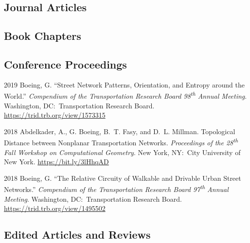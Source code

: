 \documentclass[12pt,letterpaper]{report}
\begin{document}
    \subsection*{Journal Articles}
    \printbibliography[title=Journal Articles, filter=papers]



    \subsection*{Book Chapters}

    \printbibliography[title=Book Chapters, type=incollection]


    \subsection*{Conference Proceedings}

    \begin{tablist}

        \item[2019] \tab{}Boeing, G. \enquote{Street Network Patterns, Orientation, and Entropy around the World.} \textit{Compendium of the Transportation Research Board 98\textsuperscript{th} Annual Meeting}. Washington, DC:\ Transportation Research Board. \href{https://trid.trb.org/view/1573315}{https://trid.trb.org/view/1573315}

        \item[2018] \tab{}Abdelkader, A., G. Boeing, B.~T. Fasy, and D.~L. Millman. Topological Distance between Nonplanar Transportation Networks. \textit{Proceedings of the 28\textsuperscript{th} Fall Workshop on Computational Geometry}. New York, NY:\ City University of New York. \href{https://bit.ly/3lHhqAD}{https://bit.ly/3lHhqAD}

        \item[2018] \tab{}Boeing, G. \enquote{The Relative Circuity of Walkable and Drivable Urban Street Networks.} \textit{Compendium of the Transportation Research Board 97\textsuperscript{th} Annual Meeting}. Washington, DC:\ Transportation Research Board. \href{https://trid.trb.org/view/1495502}{https://trid.trb.org/view/1495502}

    \end{tablist}



    \subsection*{Edited Articles and Reviews}
\end{document}
